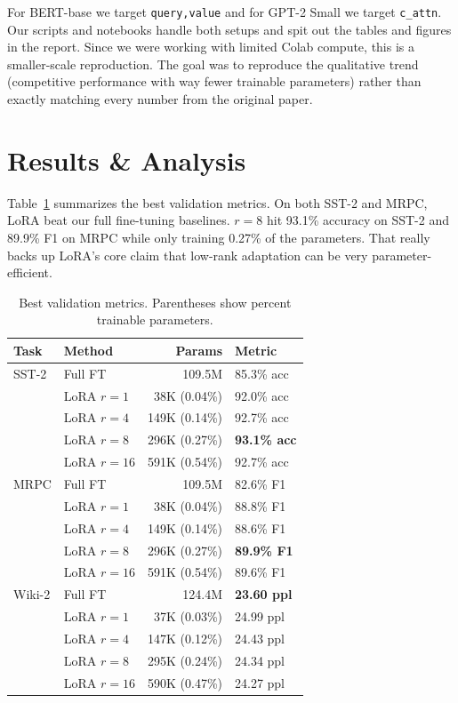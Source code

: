 \documentclass[11pt,twocolumn]{article}
\begin{document}
For BERT-base we target \texttt{query,value} and for GPT-2 Small we target \texttt{c\_attn}. Our scripts and notebooks handle both setups and spit out the tables and figures in the report. Since we were working with limited Colab compute, this is a smaller-scale reproduction. The goal was to reproduce the qualitative trend (competitive performance with way fewer trainable parameters) rather than exactly matching every number from the original paper.

\section{Results \& Analysis}
Table~\ref{tab:results} summarizes the best validation metrics. On both SST-2 and MRPC, LoRA beat our full fine-tuning baselines. $r=8$ hit 93.1\% accuracy on SST-2 and 89.9\% F1 on MRPC while only training 0.27\% of the parameters. That really backs up LoRA's core claim that low-rank adaptation can be very parameter-efficient.

\begin{table}[H]
\centering
\caption{Best validation metrics. Parentheses show percent trainable parameters.}
\label{tab:results}
\setlength{\tabcolsep}{2.5pt}
\renewcommand{\arraystretch}{0.98}
{\small
\begin{tabular}{@{}llrl@{}}
\toprule
\textbf{Task} & \textbf{Method} & \textbf{Params} & \textbf{Metric} \\
\midrule
SST-2 & Full FT & 109.5M & 85.3\% acc \\
      & LoRA $r=1$  & 38K (0.04\%) & 92.0\% acc \\
      & LoRA $r=4$  & 149K (0.14\%) & 92.7\% acc \\
      & LoRA $r=8$  & 296K (0.27\%) & \textbf{93.1\% acc} \\
      & LoRA $r=16$ & 591K (0.54\%) & 92.7\% acc \\
\midrule
MRPC  & Full FT & 109.5M & 82.6\% F1 \\
      & LoRA $r=1$  & 38K (0.04\%) & 88.8\% F1 \\
      & LoRA $r=4$  & 149K (0.14\%) & 88.6\% F1 \\
      & LoRA $r=8$  & 296K (0.27\%) & \textbf{89.9\% F1} \\
      & LoRA $r=16$ & 591K (0.54\%) & 89.6\% F1 \\
\midrule
Wiki-2 & Full FT & 124.4M & \textbf{23.60 ppl} \\
       & LoRA $r=1$  & 37K (0.03\%) & 24.99 ppl \\
       & LoRA $r=4$  & 147K (0.12\%) & 24.43 ppl \\
       & LoRA $r=8$  & 295K (0.24\%) & 24.34 ppl \\
       & LoRA $r=16$ & 590K (0.47\%) & 24.27 ppl \\
\bottomrule
\end{tabular}}
\end{table}
\end{document}
